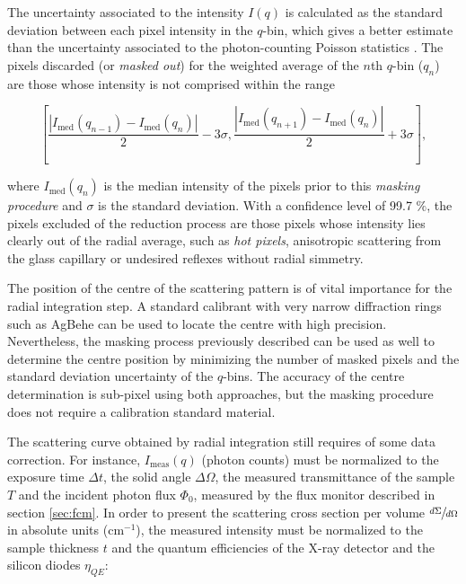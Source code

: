 The uncertainty associated to the intensity $I(q)$ is calculated as the standard deviation between each pixel intensity in the $q$-bin, which gives a better estimate than the uncertainty associated to the photon-counting Poisson statistics \citep{pauw_everything_2013}. The pixels discarded (or \emph{masked out}) for the weighted average of the $n$th $q$-bin ($q_n$) are those whose intensity is not comprised within the range 

\begin{equation}
\left[ \frac{\left|I_{\text{med}}\left( q_{n-1}\right)-I_{\text{med}}\left( q_{n}\right)\right|}{2} - 3 \sigma , \frac{\left|I_{\text{med}}\left( q_{n+1}\right)-I_{\text{med}}\left( q_{n}\right)\right|}{2} + 3 \sigma \right], 
\end{equation}

where $I_{\text{med}}\left( q_{n}\right)$ is the median intensity of the pixels prior to this \emph{masking procedure} and $\sigma$ is the standard deviation. With a confidence level of 99.7 $\%$, the pixels excluded of the reduction process are those pixels whose intensity lies clearly out of the radial average, such as \emph{hot pixels}, anisotropic scattering from the glass capillary or undesired reflexes without radial simmetry.

The position of the centre of the scattering pattern is of vital importance for the radial integration step. A standard calibrant with very narrow diffraction rings such as AgBehe can be used to locate the centre with high precision. Nevertheless, the masking process previously described can be used as well to determine the centre position by minimizing the number of masked pixels and the standard deviation uncertainty of the $q$-bins. The accuracy of the centre determination is sub-pixel using both approaches, but the masking procedure does not require a calibration standard material.

The scattering curve obtained by radial integration still requires of some data correction. For instance, $I_{\text{meas}}(q)$ (photon counts) must be normalized to the exposure time $\Delta t$, the solid angle $\Delta \Omega$, the measured transmittance of the sample $T$ and the incident photon flux $\Phi_0$, measured by the flux monitor described in section \ref{sec:fcm}. In order to present the scattering cross section per volume $\sfrac{d\Sigma}{d\Omega}$ in absolute units (cm$^{-1}$), the measured intensity must be normalized to the sample thickness $t$ and the quantum efficiencies of the X-ray detector and the silicon diodes $\eta_{QE}$: 

